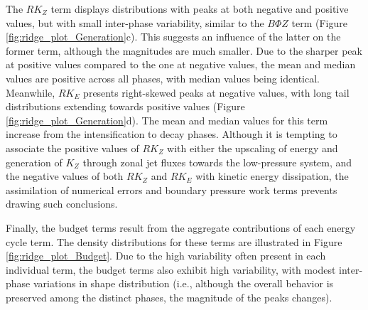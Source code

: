 The $RK_Z$ term displays distributions with peaks at both negative and positive values, but with small inter-phase variability, similar to the $B\Phi Z$ term (Figure \ref{fig:ridge_plot_Generation}c). This suggests an influence of the latter on the former term, although the magnitudes are much smaller. Due to the sharper peak at positive values compared to the one at negative values, the mean and median values are positive across all phases, with median values being identical. Meanwhile, $RK_E$ presents right-skewed peaks at negative values, with long tail distributions extending towards positive values (Figure \ref{fig:ridge_plot_Generation}d). The mean and median values for this term increase from the intensification to decay phases. Although it is tempting to associate the positive values of $RK_Z$ with either the upscaling of energy and generation of $K_Z$ through zonal jet fluxes towards the low-pressure system, and the negative values of both $RK_Z$ and $RK_E$ with kinetic energy dissipation, the assimilation of numerical errors and boundary pressure work terms prevents drawing such conclusions.

Finally, the budget terms result from the aggregate contributions of each energy cycle term. The density distributions for these terms are illustrated in Figure \ref{fig:ridge_plot_Budget}. Due to the high variability often present in each individual term, the budget terms also exhibit high variability, with modest inter-phase variations in shape distribution (i.e., although the overall behavior is preserved among the distinct phases, the magnitude of the peaks changes).

